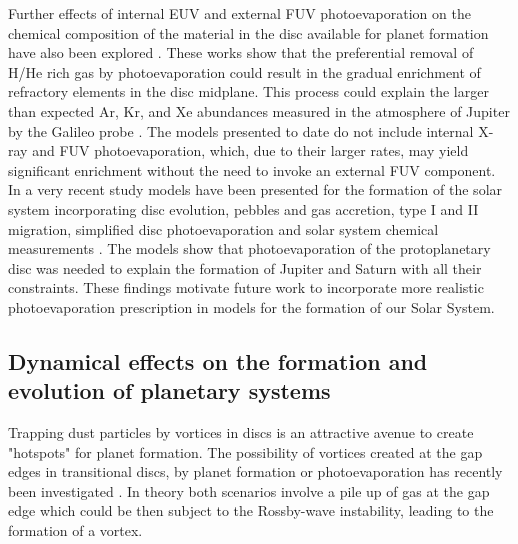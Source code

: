 \documentclass{rsos}
\begin{document}
Further effects of internal EUV and external FUV photoevaporation on  the chemical composition of the material in the disc available for planet formation have also been explored  \cite{2006MNRAS.367L..47G, 2015ApJ...798....9M}. These works show that the preferential removal of H/He rich gas by photoevaporation could result in  the gradual enrichment of refractory elements in the disc midplane. This process could explain the larger than expected Ar, Kr, and Xe abundances measured in the atmosphere of Jupiter by the Galileo probe \cite{1999Natur.402..269O}. The models presented to date do not include internal X-ray  and FUV photoevaporation, which, due to their larger rates, may yield  significant enrichment without the need to invoke an external FUV component.  In a very recent study models have been presented for the formation of the solar system incorporating disc evolution, pebbles and gas accretion, type I and II migration, simplified disc photoevaporation and solar system chemical measurements \cite{2017MNRAS.464.4282A}. The models show that photoevaporation of the protoplanetary disc was needed to explain the formation of Jupiter and Saturn with all their constraints.  These findings motivate future work to incorporate more realistic photoevaporation prescription in models for the formation of our Solar System. 

\subsection{Dynamical effects on the formation and evolution of planetary systems}

Trapping dust particles by vortices in discs is an attractive avenue to create "hotspots" for planet formation. 
The possibility of vortices created at the gap edges in transitional discs, by planet formation or photoevaporation has recently been investigated \cite{2014ApJ...795...53Z, 2016MNRAS.458.3927B}. In theory both scenarios involve a pile up of gas at the gap edge which could be then subject to the Rossby-wave instability, leading to the formation of a vortex. 
\end{document}

